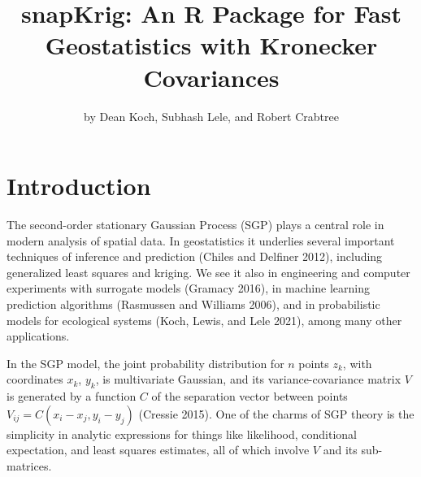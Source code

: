 \title{snapKrig: An R Package for Fast Geostatistics with Kronecker Covariances}
\author{by Dean Koch, Subhash Lele, and Robert Crabtree}

\maketitle


\hypertarget{introduction}{%
\section{Introduction}\label{introduction}}

The second-order stationary Gaussian Process (SGP) plays a central role in modern analysis of spatial data. In geostatistics it underlies several important techniques of inference and prediction (Chiles and Delfiner 2012), including generalized least squares and kriging. We see it also in engineering and computer experiments with surrogate models (Gramacy 2016), in machine learning prediction algorithms (Rasmussen and Williams 2006), and in probabilistic models for ecological systems (Koch, Lewis, and Lele 2021), among many other applications.

In the SGP model, the joint probability distribution for \(n\) points \(z_k\), with coordinates \(x_k\), \(y_k\), is multivariate Gaussian, and its variance-covariance matrix \(V\) is generated by a function \(C\) of the separation vector between points \(V_{ij} = C ( x_i - x_j, y_i - y_j )\) (Cressie 2015). One of the charms of SGP theory is the simplicity in analytic expressions for things like likelihood, conditional expectation, and least squares estimates, all of which involve \(V\) and its sub-matrices.


